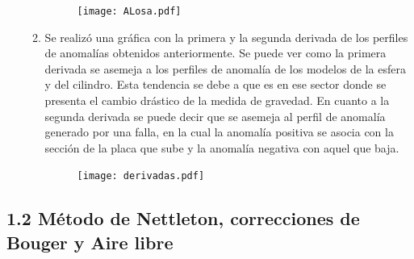 \documentclass{article}
\begin{document}
\begin{enumerate}
\begin{enumerate}
	\begin{figure}[H]\centering
	\texttt{[image: ALosa.pdf]}
	\end{figure}
	\item Se realiz\'o una gr\'afica con la primera y la segunda derivada de los perfiles de anomal\'ias obtenidos anteriormente. Se puede ver como la primera derivada se asemeja a los perfiles de anomal\'ia de los modelos de la esfera y del cilindro. Esta tendencia se debe a que es en ese sector donde se presenta el cambio dr\'astico de la medida de gravedad. En cuanto a la segunda derivada se puede decir que se asemeja al perfil de anomal\'ia generado por una falla, en la cual la anomal\'ia positiva se asocia con la secci\'on de la placa que sube y la anomal\'ia negativa con aquel que baja.
	\begin{figure}[H]\centering
	\texttt{[image: derivadas.pdf]}
	\end{figure}
	\end{enumerate}
\end{enumerate}%

\subsection*{1.2 M\'etodo de Nettleton, correcciones de Bouger y Aire libre}
\end{document}
